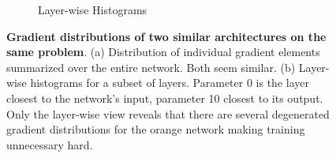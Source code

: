 \begin{figure}
\begin{subfigure}[t]{0.57\textwidth}
		    \vspace{-0.1cm}\hspace{-0.25\baselineskip}\hfill
		    
		    \hfill
		    
		    \hfill
		    
		    \hfill
		\caption{Layer-wise Histograms}
		\label{fig:layerwise-experiment_layers}
	\end{subfigure}
	\caption{\textbf{Gradient distributions of two similar architectures on the 
		same problem}. (a) Distribution of individual gradient elements 
		summarized over the entire network. Both seem similar.
		(b) Layer-wise histograms for a subset of layers. Parameter 0 is the layer 
		closest to the network's input, parameter 10 closest to its output. 
		Only the layer-wise view reveals that there are several degenerated gradient 
		distributions for the orange network making training unnecessary hard.}
	\label{fig:layerwise-experiment}
\end{figure}


